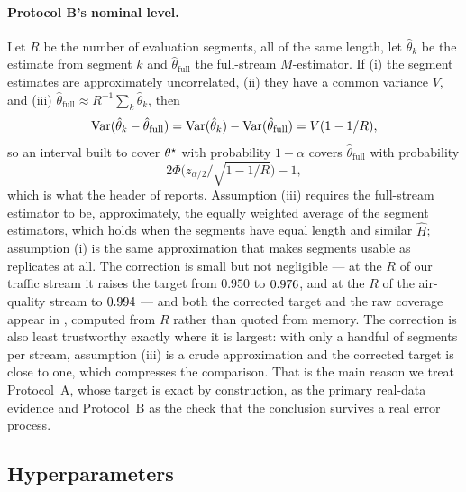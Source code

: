 \paragraph{Protocol B's nominal level.} Let $R$ be the number of evaluation segments, all of
the same length, let $\hat\theta_k$ be the estimate from segment $k$ and
$\hat\theta_{\mathrm{full}}$ the full-stream $M$-estimator. If (i) the segment estimates are
approximately uncorrelated, (ii) they have a common variance $V$, and (iii)
$\hat\theta_{\mathrm{full}}\approx R^{-1}\sum_k\hat\theta_k$, then
\[
\operatorname{Var}(\hat\theta_k-\hat\theta_{\mathrm{full}})
=\operatorname{Var}(\hat\theta_k)-\operatorname{Var}(\hat\theta_{\mathrm{full}})=V(1-1/R),
\]
so an interval built to cover $\theta^\star$ with probability $1-\alpha$ covers
$\hat\theta_{\mathrm{full}}$ with probability
\[
2\Phi\big(z_{\alpha/2}/\sqrt{1-1/R}\big)-1,
\]
which is what the header of  reports. Assumption (iii) requires the full-stream estimator to be, approximately, the equally
weighted average of the segment estimators, which holds when the segments have equal length and
similar $\widehat H$; assumption (i) is the same approximation that makes segments usable as
replicates at all. The correction is small but not negligible --- at the $R$ of our traffic stream it raises the target
from $0.950$ to $0.976$, and at the $R$ of the air-quality stream to
$0.994$ --- and both the corrected target and the raw coverage appear in
, computed from $R$ rather than quoted from memory. The correction is also least
trustworthy exactly where it is largest: with only a handful of segments per stream, assumption
(iii) is a crude approximation and the corrected target is close to one, which compresses the
comparison. That is the main reason we treat Protocol~A, whose target is exact by construction,
as the primary real-data evidence and Protocol~B as the check that the conclusion survives a real
error process.

\subsection{Hyperparameters}
\label{app:hyper}

